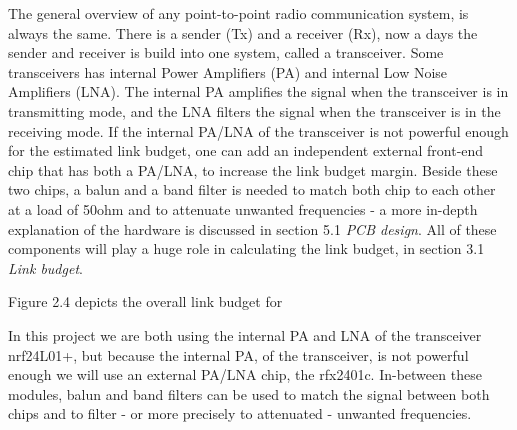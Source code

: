 The general overview of any point-to-point radio communication system, is always the same. There is a sender (Tx) and a receiver (Rx), now a days the sender and receiver is build into one system, called a transceiver. Some transceivers has internal Power Amplifiers (PA) and internal Low Noise Amplifiers (LNA). The internal PA amplifies the signal when the transceiver is in transmitting mode, and the LNA filters the signal when the transceiver is in the receiving mode. If the internal PA/LNA of the transceiver is not powerful enough for the estimated link budget, one can add an independent external front-end chip that has both a PA/LNA, to increase the link budget margin. Beside these two chips, a balun and a band filter is needed to match both chip to each other at a load of 50ohm and to attenuate unwanted frequencies - a more in-depth explanation of the hardware is discussed in section 5.1 \textit{PCB design}. All of these components will play a huge role in calculating the link budget, in section 3.1 \textit{Link budget}. 

Figure 2.4 depicts the overall link budget for 

In this project we are both using the internal PA and LNA of the transceiver nrf24L01+\cite{nrf24l01+}, but because the internal PA, of the transceiver, is not powerful enough we will use an external PA/LNA chip, the rfx2401c\cite{RFX2401C}. In-between these modules, balun and band filters can be used to match the signal between both chips and to filter - or more precisely to attenuated - unwanted frequencies.

